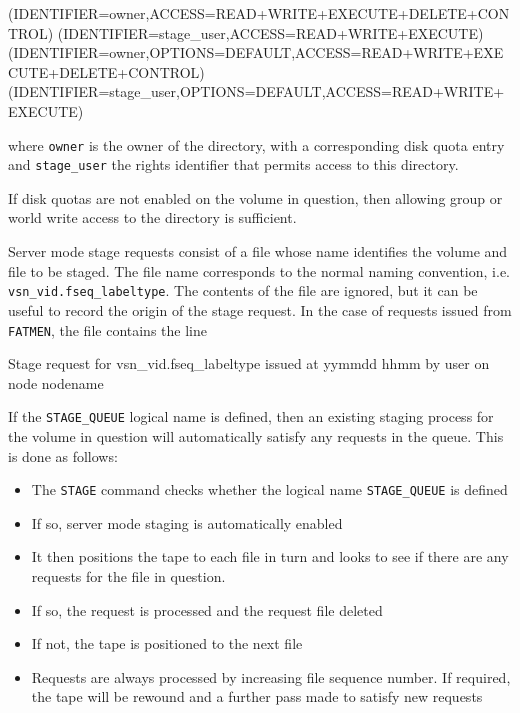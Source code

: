 \begin{XMP}
(IDENTIFIER=owner,ACCESS=READ+WRITE+EXECUTE+DELETE+CONTROL)
(IDENTIFIER=stage\_user,ACCESS=READ+WRITE+EXECUTE)
(IDENTIFIER=owner,OPTIONS=DEFAULT,ACCESS=READ+WRITE+EXECUTE+DELETE+CONTROL)
(IDENTIFIER=stage\_user,OPTIONS=DEFAULT,ACCESS=READ+WRITE+EXECUTE)
\end{XMP}

where {\tt owner} is the owner of the directory, with a corresponding
disk quota entry and {\tt stage\_user} the rights identifier
that permits access to this directory.

If disk quotas are not enabled on the volume in question, then
allowing group or world write access to the directory is sufficient.

Server mode stage requests consist of a file whose name identifies
the volume and file to be staged. The file name corresponds to the
normal naming convention, i.e. {\tt vsn\_vid.fseq\_labeltype}.
The contents of the file are ignored, but it can be useful to
record the origin of the stage request. In the case of requests
issued from {\tt FATMEN}, the file contains the line

{\small
\begin{XMP}
Stage request for vsn\_vid.fseq\_labeltype issued at yymmdd hhmm by user on node nodename
\end{XMP}
}

If the {\tt STAGE\_QUEUE} logical name is defined, then an existing
staging process for the volume in question will automatically
satisfy any requests in the queue. This is done as follows:

\begin{itemize}
\item
The {\tt STAGE} command checks whether the logical name {\tt STAGE\_QUEUE}
is defined
\item
If so, server mode staging is automatically enabled
\item
It then positions the tape to each file in turn and looks to
see if there are any requests for the file in question.
\item
If so, the request is processed and the request file deleted
\item
If not, the tape is positioned to the next file
\item
Requests are always processed by increasing file sequence number.
If required, the tape will be rewound and a further pass made
to satisfy new requests
\end{itemize}

